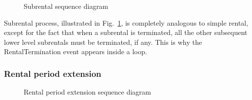 \documentclass[english, LaM, oneside]{sapthesis}%
\begin{document}
\begin{figure}
    \centering
        \begin{adjustbox}{width=1\textwidth}
        \end{adjustbox}
    \caption{Subrental sequence diagram}
    \label{fig:Subrental SD}
\end{figure}

Subrental process, illustrated in Fig.~\ref{fig:Subrental SD}, is completely analogous to simple rental, except for the fact that when a subrental is terminated, all the other subsequent lower level subrentals must be terminated, if any. This is why the RentalTermination event appears inside a loop.\newline
\bigskip

\subsubsection{Rental period extension}

\begin{figure}
    \centering
        \begin{adjustbox}{width=1\textwidth}
        \end{adjustbox}
    \caption{Rental period extension sequence diagram}
    \label{fig:RentalUpdate SD}
\end{figure}
\end{document}
